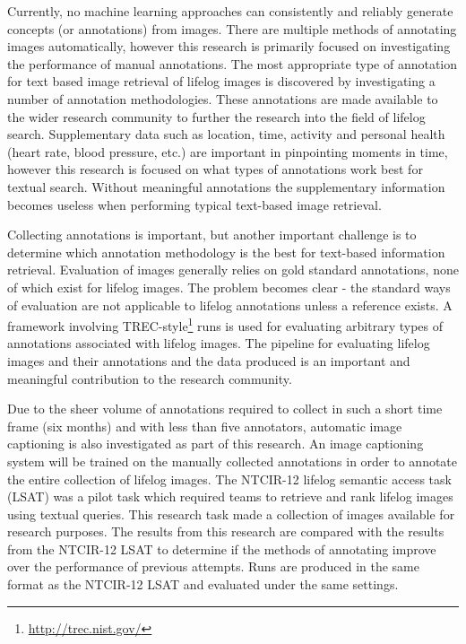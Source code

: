 Currently, no machine learning approaches can consistently and reliably generate concepts (or annotations) from images. There are multiple methods of annotating images automatically, however this research is primarily focused on investigating the performance of manual annotations. The most appropriate type of annotation for text based image retrieval of lifelog images is discovered by investigating a number of annotation methodologies. These annotations are made available to the wider research community to further the research into the field of lifelog search. Supplementary data such as location, time, activity and personal health (heart rate, blood pressure, etc.) are important in pinpointing moments in time, however this research is focused on what types of annotations work best for textual search. Without meaningful annotations the supplementary information becomes useless when performing typical text-based image retrieval.

Collecting annotations is important, but another important challenge is to determine which annotation methodology is the best for text-based information retrieval. Evaluation of images generally relies on gold standard annotations, none of which exist for lifelog images. The problem becomes clear - the standard ways of evaluation are not applicable to lifelog annotations unless a reference exists. A framework involving TREC-style\footnote{\url{http://trec.nist.gov/}} runs is used for evaluating arbitrary types of annotations associated with lifelog images. The pipeline for evaluating lifelog images and their annotations and the data produced is an important and meaningful contribution to the research community. 

Due to the sheer volume of annotations required to collect in such a short time frame (six months) and with less than five annotators, automatic image captioning is also investigated as part of this research. An image captioning system will be trained on the manually collected annotations in order to annotate the entire collection of lifelog images. The NTCIR-12 lifelog semantic access task (LSAT) was a pilot task which required teams to retrieve and rank lifelog images using textual queries. This research task made a collection of images available for research purposes. The results from this research are compared with the results from the NTCIR-12 LSAT to determine if the methods of annotating improve over the performance of previous attempts. Runs are produced in the same format as the NTCIR-12 LSAT and evaluated under the same settings.

